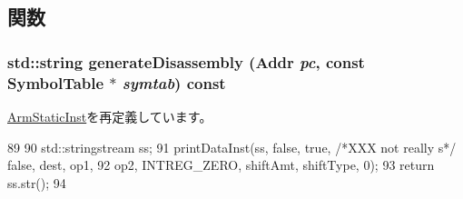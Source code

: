 \subsection{関数}
\hypertarget{classArmISA_1_1DataRegOp_a95d323a22a5f07e14d6b4c9385a91896}{
\subsubsection[{generateDisassembly}]{\setlength{\rightskip}{0pt plus 5cm}std::string generateDisassembly ({\bf Addr} {\em pc}, \/  const SymbolTable $\ast$ {\em symtab}) const}}
\label{classArmISA_1_1DataRegOp_a95d323a22a5f07e14d6b4c9385a91896}


\hyperlink{classArmISA_1_1ArmStaticInst_a95d323a22a5f07e14d6b4c9385a91896}{ArmStaticInst}を再定義しています。


\begin{DoxyCode}
89 {
90     std::stringstream ss;
91     printDataInst(ss, false, true, /*XXX not really s*/ false, dest, op1,
92                   op2, INTREG_ZERO, shiftAmt, shiftType, 0);
93     return ss.str();
94 }
\end{DoxyCode}


